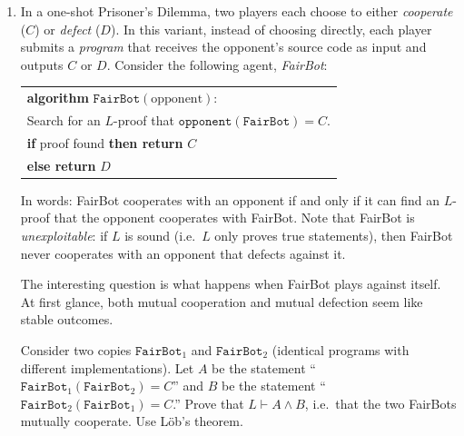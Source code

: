 \documentclass[11pt]{article}
\begin{document}
\begin{exercise}
\begin{enumerate}
\begin{remark}
\medskip
\noindent
This is what makes L\"ob's theorem, rather than G\"odel's, the fundamental obstacle
for tiling agents. Recall the setup from \cref{ex:godel}: a parent agent $A_1$ builds a
child $A_0$ that only takes actions it can prove to be safe. For $A_1$ to trust
$A_0$, it needs to know that $A_0$'s proofs track reality --- that is, $A_1$ needs
$\Box P \to P$ for the statements $P$ that $A_0$ might act on. G\"odel tells us
$A_1$ cannot prove $A_0$'s system is \emph{consistent}. But L\"ob tells us something
far stronger: $A_1$ cannot even trust $A_0$'s system on a \emph{case-by-case} basis.
For any individual statement $C$, the only way $L$ can derive ``if my proof system
proves $C$, then $C$ is really true'' is if $C$ was already provable --- in which
case the trust was never needed in the first place.
\end{remark}

\item \label{ex:lob-e} In a one-shot Prisoner's Dilemma, two players each choose to
either \emph{cooperate} ($C$) or \emph{defect} ($D$). In this variant, instead of
choosing directly, each player submits a \emph{program} that receives the opponent's
source code as input and outputs $C$ or $D$. Consider the following agent,
\emph{FairBot}:

\medskip
\begin{center}
\begin{tabular}{l}
\textbf{algorithm} $\texttt{FairBot}(\text{opponent})$:\\
\quad Search for an $L$-proof that
  $\texttt{opponent}(\texttt{FairBot}) = C$.\\
\quad \textbf{if} proof found \textbf{then return} $C$\\
\quad \textbf{else return} $D$
\end{tabular}
\end{center}

\medskip
\noindent
In words: FairBot cooperates with an opponent if and only if it can find an $L$-proof
that the opponent cooperates with FairBot. Note that FairBot is
\emph{unexploitable}: if $L$ is sound (i.e.\ $L$ only proves true statements), then
FairBot never cooperates with an opponent that defects against it.

\medskip
\noindent
The interesting question is what happens when FairBot plays against itself. At first
glance, both mutual cooperation and mutual defection seem like stable outcomes.

\medskip
\noindent
Consider two copies $\texttt{FairBot}_1$ and $\texttt{FairBot}_2$ (identical programs
with different implementations). Let $A$ be the statement
``$\texttt{FairBot}_1(\texttt{FairBot}_2) = C$'' and $B$ be the statement
``$\texttt{FairBot}_2(\texttt{FairBot}_1) = C$.'' Prove that
$L \vdash A \wedge B$, i.e.\ that the two FairBots mutually cooperate. Use L\"ob's
theorem.


\end{enumerate}
\end{exercise}
\end{document}
